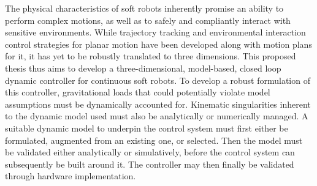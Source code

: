 
The physical characteristics of soft robots inherently promise an ability to perform complex motions, as well as to safely and compliantly interact with sensitive environments. 
While trajectory tracking and environmental interaction control strategies for planar motion have been developed along with motion plans for it, it has yet to be robustly translated to three dimensions. 
This proposed thesis thus aims to develop a three-dimensional, model-based, closed loop dynamic controller for continuous soft robots.
To develop a robust formulation of this controller, gravitational loads that could potentially violate model assumptions must be dynamically accounted for. Kinematic singularities inherent to the dynamic model used must also be analytically or numerically managed.
A suitable dynamic model to underpin the control system must first either be formulated, augmented from an existing one, or selected. Then the model must be validated either analytically or simulatively, before the control system can subsequently be built around it. The controller may then finally be validated through hardware implementation.
